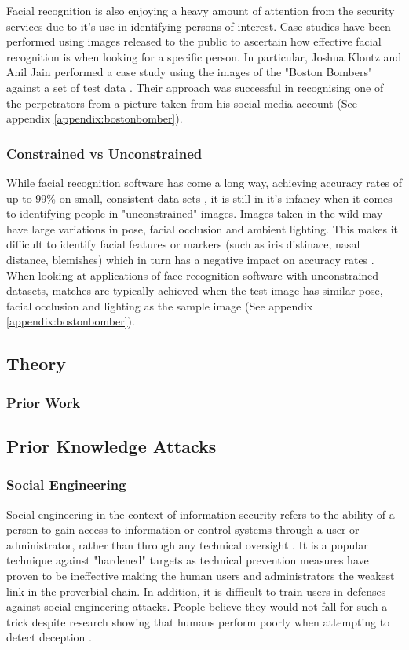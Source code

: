 \documentclass{article}
\begin{document}
Facial recognition is also enjoying a heavy amount of attention from the security services due to it's use in identifying persons of interest. Case studies have been performed using images released to the public to ascertain how effective facial recognition is when looking for a specific person. In particular, Joshua Klontz and Anil Jain performed a case study using the images of the "Boston Bombers" against a set of test data \citep{bostonbombingcasestudy}. Their approach was successful in recognising one of the perpetrators from a picture taken from his social media account (See appendix \ref{appendix:bostonbomber}).

\subsubsection{Constrained vs Unconstrained}
While facial recognition software has come a long way, achieving accuracy rates of up to 99\% on small, consistent data sets \citep{facialrecogidentifyingpoi}, it is still in it's infancy when it comes to identifying people in "unconstrained" images. Images taken in the wild may have large variations in pose, facial occlusion and ambient lighting. This makes it difficult to identify facial features or markers (such as iris distinace, nasal distance, blemishes) which in turn has a negative impact on accuracy rates \citep{unconstrainedfacialrecogbenchmark}. When looking at applications of face recognition software with unconstrained datasets, matches are typically achieved when the test image has similar pose, facial occlusion and lighting as the sample image (See appendix \ref{appendix:bostonbomber}).

\subsection{Theory}
\subsubsection{Prior Work}

\subsection{Prior Knowledge Attacks}
\subsubsection{Social Engineering}
Social engineering in the context of information security refers to the ability of a person to gain access to information or control systems through a user or administrator, rather than through any technical oversight \citep{socialengineeringvulnerabilites}. It is a popular technique against "hardened" targets as technical prevention measures have proven to be ineffective \citep{advancedsocialengineering} making the human users and administrators the weakest link in the proverbial chain. In addition, it is difficult to train users in defenses against social engineering attacks. People believe they would not fall for such a trick despite research showing that humans perform poorly when attempting to detect deception \citep{advancedsocialengineering}\citep{socialengineeringvulnerabilites}. 
\end{document}

